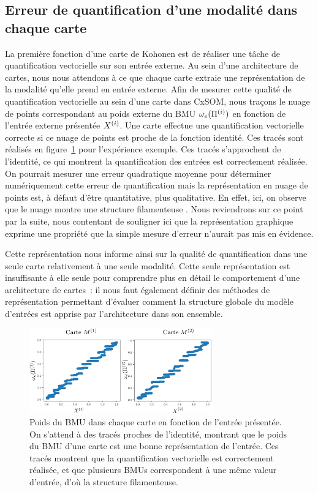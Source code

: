 \documentclass[../main]{subfiles}
\begin{document}
\subsection{Erreur de quantification d'une modalité dans chaque carte}

La première fonction d'une carte de Kohonen est de réaliser une tâche de quantification vectorielle sur son entrée externe. Au sein d'une architecture de cartes, nous nous attendons à ce que chaque carte extraie une représentation de la modalité qu'elle prend en entrée externe.
Afin de mesurer cette qualité de quantification vectorielle au sein d'une carte dans CxSOM, nous traçons le nuage de points correspondant au poids externe du BMU $\omega_e(\Pi^{({i})})$ en fonction de l'entrée externe présentée $X^{({i})}$. Une carte effectue une quantification vectorielle correcte si ce nuage de points est proche de la fonction identité.
Ces tracés sont réalisés en figure~\ref{fig:erreur} pour l'expérience exemple. Ces tracés s'approchent de l'identité, ce qui montrent la quantification des entrées est correctement réalisée.
On pourrait mesurer une erreur quadratique moyenne pour déterminer numériquement cette erreur de quantification mais la représentation en nuage de points est, à défaut d'être quantitative, plus qualitative. 
En effet, ici, on observe que le nuage montre une structure \og filamenteuse \fg{}. Nous reviendrons sur ce point par la suite, nous contentant de souligner ici que la représentation graphique exprime une propriété que la simple mesure d'erreur n'aurait pas mis en évidence.

Cette représentation nous informe ainsi sur la qualité de quantification dans une seule carte relativement à une seule modalité. Cette seule représentation est insuffisante à elle seule pour comprendre plus en détail le comportement d'une architecture de cartes~: il nous faut également définir des méthodes de représentation permettant d'évaluer comment la structure globale du modèle d'entrées est apprise par l'architecture dans son ensemble.

\begin{figure}
    \centering
    \includegraphics[width=0.7\textwidth]{w_x.pdf}
    \caption{Poids du BMU dans chaque carte en fonction de l'entrée présentée. On s'attend à des tracés proches de l'identité, montrant que le poids du BMU d'une carte est une bonne représentation de l'entrée. Ces tracés montrent que la quantification vectorielle est correctement réalisée, et que plusieurs BMUs correspondent à une même valeur d'entrée, d'où la structure filamenteuse. \label{fig:erreur}}
\end{figure}
\end{document}
